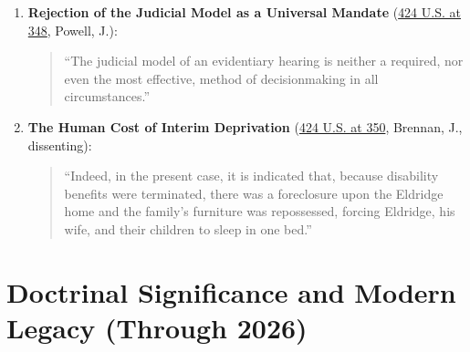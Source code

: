 \documentclass[12pt]{article}
\begin{document}
\begin{enumerate}
    \item \textbf{Rejection of the Judicial Model as a Universal Mandate} (\href{https://supreme.justia.com/cases/federal/us/424/319/}{424 U.S. at 348}, Powell, J.):
    \begin{quote}
    ``The judicial model of an evidentiary hearing is neither a required, nor even the most effective, method of decisionmaking in all circumstances.''
    \end{quote}

    \item \textbf{The Human Cost of Interim Deprivation} (\href{https://supreme.justia.com/cases/federal/us/424/319/}{424 U.S. at 350}, Brennan, J., dissenting):
    \begin{quote}
    ``Indeed, in the present case, it is indicated that, because disability benefits were terminated, there was a foreclosure upon the Eldridge home and the family's furniture was repossessed, forcing Eldridge, his wife, and their children to sleep in one bed.''
    \end{quote}
\end{enumerate}

\section{Doctrinal Significance and Modern Legacy (Through 2026)}
\end{document}
